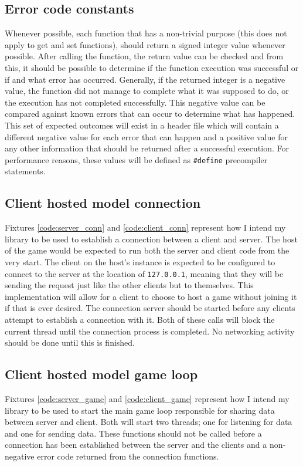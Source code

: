 \subsection{Error code constants}
Whenever possible, each function that has a non-trivial purpose (this does not apply to get and set functions), should return a signed integer value whenever possible. After calling the function, the return value can be checked and from this, it should be possible to determine if the function execution was successful or if and what error has occurred. Generally, if the returned integer is a negative value, the function did not manage to complete what it was supposed to do, or the execution has not completed successfully. This negative value can be compared against known errors that can occur to determine what has happened. This set of expected outcomes will exist in a header file which will contain a different negative value for each error that can happen and a positive value for any other information that should be returned after a successful execution. For performance reasons, these values will be defined as \lstinline{#define} precompiler statements.


\newpage
\subsection{Client hosted model connection}
Fixtures \ref{code:server_conn} and \ref{code:client_conn} represent how I intend my library to be used to establish a connection between a client and server. The host of the game would be expected to run both the server and client code from the very start. The client on the host's instance is expected to be configured to connect to the server at the location of \lstinline{127.0.0.1}, meaning that they will be sending the request just like the other clients but to themselves. This implementation will allow for a client to choose to host a game without joining it if that is ever desired. The connection server should be started before any clients attempt to establish a connection with it. Both of these calls will block the current thread until the connection process is completed. No networking activity should be done until this is finished.




\newpage
\subsection{Client hosted model game loop}
Fixtures \ref{code:server_game} and \ref{code:client_game} represent how I intend my library to be used to start the main game loop responsible for sharing data between server and client. Both will start two threads; one for listening for data and one for sending data. These functions should not be called before a connection has been established between the server and the clients and a non-negative error code returned from the connection functions.

